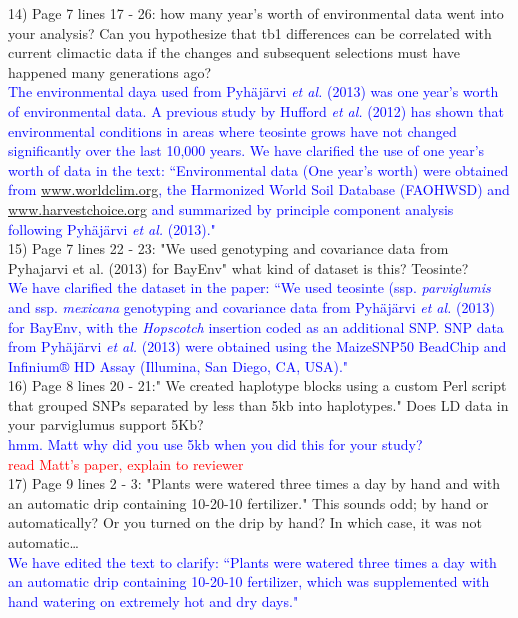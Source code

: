 \documentclass[11pt]{article}
\newcommand{\res}[1]{\noindent \textcolor{blue}{{#1}} \\}
\newcommand{\jri}[1]{\noindent \textcolor{red}{{#1}} \\}
\begin{document}
14) Page 7 lines 17 - 26: how many year's worth of environmental data went into your analysis? Can you hypothesize that tb1 differences can be correlated with current climactic data if the changes and subsequent selections must have happened many generations ago?\\
 
\res{The environmental daya used from Pyh{\"a}j{\"a}rvi \emph{et al.} (2013) was one year's worth of environmental data. A previous study by Hufford \emph{et al.} (2012) has shown that environmental conditions in areas where teosinte grows have not changed significantly over the last 10,000 years. We have clarified the use of one year's worth of data in the text: ``Environmental data (One year's worth) were obtained from \url{www.worldclim.org}, the Harmonized World Soil Database (FAOHWSD) and \url{www.harvestchoice.org} and summarized by principle component analysis following Pyh{\"a}j{\"a}rvi \emph{et al.} (2013)."}

15) Page 7 lines 22 - 23: "We used genotyping and covariance data from Pyhajarvi et al. (2013) for BayEnv" what kind of dataset is this? Teosinte?\\ 

\res{We have clarified the dataset in the paper: ``We used teosinte (ssp. \emph{parviglumis} and ssp. \emph{mexicana} genotyping and covariance data from Pyh{\"a}j{\"a}rvi \emph{et al.} (2013) for BayEnv, with the \emph{Hopscotch} insertion coded as an additional SNP. SNP data from Pyh{\"a}j{\"a}rvi \emph{et al.} (2013) were obtained using the MaizeSNP50 BeadChip and Infinium® HD Assay (Illumina, San Diego, CA, USA)."}

16) Page 8 lines 20 - 21:" We created haplotype blocks using a custom Perl script that grouped SNPs separated by less than 5kb into haplotypes." Does LD data in your parviglumus support 5Kb?\\ 

\res{hmm. Matt why did you use 5kb when you did this for your study?}
\jri{read Matt's paper, explain to reviewer}

17) Page 9 lines 2 - 3: "Plants were watered three times a day by hand and with an automatic drip containing 10-20-10 fertilizer." This sounds odd; by hand or automatically? Or you turned on the drip by hand? In which case, it was not automatic… \\

\res{We have edited the text to clarify: ``Plants were watered three times a day with an automatic drip containing 10-20-10 fertilizer, which was supplemented with hand watering on extremely hot and dry days."}
\end{document}
